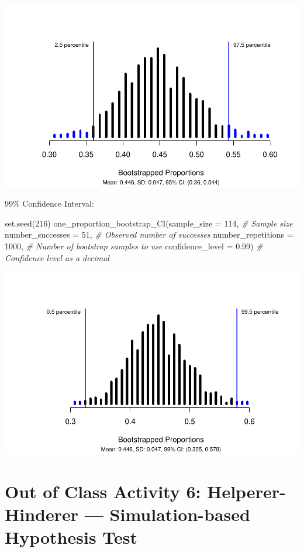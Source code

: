 \documentclass[
]{report}
\newenvironment{Shaded}{\begin{snugshade}}{\end{snugshade}}
\newcommand{\AttributeTok}[1]{\textcolor[rgb]{0.77,0.63,0.00}{#1}}
\newcommand{\CommentTok}[1]{\textcolor[rgb]{0.56,0.35,0.01}{\textit{#1}}}
\newcommand{\DecValTok}[1]{\textcolor[rgb]{0.00,0.00,0.81}{#1}}
\newcommand{\FloatTok}[1]{\textcolor[rgb]{0.00,0.00,0.81}{#1}}
\newcommand{\FunctionTok}[1]{\textcolor[rgb]{0.00,0.00,0.00}{#1}}
\newcommand{\NormalTok}[1]{#1}
\begin{document}
\begin{center}\includegraphics[width=0.7\linewidth]{06-LN06-1cat_simulation_files/figure-latex/unnamed-chunk-4-1} \end{center}

99\% Confidence Interval:

\begin{Shaded}
\begin{Highlighting}[]
\FunctionTok{set.seed}\NormalTok{(}\DecValTok{216}\NormalTok{)}
\FunctionTok{one\_proportion\_bootstrap\_CI}\NormalTok{(}\AttributeTok{sample\_size =} \DecValTok{114}\NormalTok{, }\CommentTok{\# Sample size}
                    \AttributeTok{number\_successes =} \DecValTok{51}\NormalTok{, }\CommentTok{\# Observed number of successes}
                    \AttributeTok{number\_repetitions =} \DecValTok{1000}\NormalTok{, }\CommentTok{\# Number of bootstrap samples to use}
                    \AttributeTok{confidence\_level =} \FloatTok{0.99}\NormalTok{) }\CommentTok{\# Confidence level as a decimal}
\end{Highlighting}
\end{Shaded}

\begin{center}\includegraphics[width=0.7\linewidth]{06-LN06-1cat_simulation_files/figure-latex/unnamed-chunk-5-1} \end{center}
\newpage

\hypertarget{out-of-class-activity-6-helperer-hinderer-simulation-based-hypothesis-test}{%
\section{Out of Class Activity 6: Helperer-Hinderer --- Simulation-based Hypothesis Test}\label{out-of-class-activity-6-helperer-hinderer-simulation-based-hypothesis-test}}
\end{document}
